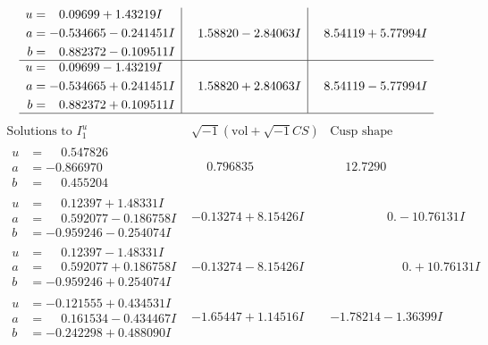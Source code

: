 \documentclass[1p]{elsarticle_modified}
\theoremstyle{definition}
\newcommand{\I}{\sqrt{-1}}
\begin{document}
$$\begin{array}{c|c|c}
\begin{aligned}
u &= \phantom{-}0.09699 + 1.43219 I \\
a &= -0.534665 - 0.241451 I \\
b &= \phantom{-}0.882372 - 0.109511 I\end{aligned}
 & \phantom{-}1.58820 - 2.84063 I & \phantom{-}8.54119 + 5.77994 I \\ \hline\begin{aligned}
u &= \phantom{-}0.09699 - 1.43219 I \\
a &= -0.534665 + 0.241451 I \\
b &= \phantom{-}0.882372 + 0.109511 I\end{aligned}
 & \phantom{-}1.58820 + 2.84063 I & \phantom{-}8.54119 - 5.77994 I\\
 \hline 
 \end{array}$$\newpage$$\begin{array}{c|c|c}  
\text{Solutions to }I^u_{1}& \I (\text{vol} + \sqrt{-1}CS) & \text{Cusp shape}\\
 \hline 
\begin{aligned}
u &= \phantom{-}0.547826\phantom{ +0.000000I} \\
a &= -0.866970\phantom{ +0.000000I} \\
b &= \phantom{-}0.455204\phantom{ +0.000000I}\end{aligned}
 & \phantom{-}0.796835\phantom{ +0.000000I} & \phantom{-}12.7290\phantom{ +0.000000I} \\ \hline\begin{aligned}
u &= \phantom{-}0.12397 + 1.48331 I \\
a &= \phantom{-}0.592077 - 0.186758 I \\
b &= -0.959246 - 0.254074 I\end{aligned}
 & -0.13274 + 8.15426 I & \phantom{-0.000000 } 0. - 10.76131 I \\ \hline\begin{aligned}
u &= \phantom{-}0.12397 - 1.48331 I \\
a &= \phantom{-}0.592077 + 0.186758 I \\
b &= -0.959246 + 0.254074 I\end{aligned}
 & -0.13274 - 8.15426 I & \phantom{-0.000000 -}0. + 10.76131 I \\ \hline\begin{aligned}
u &= -0.121555 + 0.434531 I \\
a &= \phantom{-}0.161534 - 0.434467 I \\
b &= -0.242298 + 0.488090 I\end{aligned}
 & -1.65447 + 1.14516 I & -1.78214 - 1.36399 I \\ \hline\begin{aligned}

\end{aligned}
\end{array}$$
\end{document}
